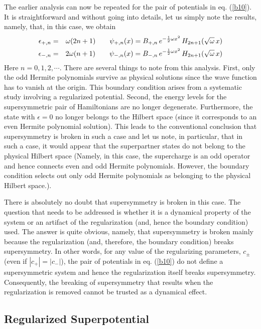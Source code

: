 \documentclass[a4paper,11pt]{article}
\begin{document}
The earlier analysis can now be repeated for the pair of potentials in
eq. (\ref{b10}). It
is straightforward and without going into details, let us simply note
the results, namely, that, in this case, we obtain
\begin{eqnarray}
\epsilon_{+,n} & = & \omega(2n+1)\qquad
\psi_{+,n}(x)=B_{+,n}\,e^{-{1\over 2}\omega
x^{2}}\,H_{2n+1}(\sqrt{\omega}\,x)\nonumber\\
\epsilon_{-,n} & = & 2\omega(n+1)\qquad
\psi_{-,n}(x)=B_{-,n}\,e^{-{1\over 2}\omega
x^{2}}\,H_{2n+1}(\sqrt{\omega}\,x)\label{b11}
\end{eqnarray}
Here $n=0,1,2,\cdots$. There are several things to note from this
analysis. First, only the odd Hermite polynomials survive as physical
solutions since the wave function has to vanish at the origin. This
boundary condition
arises from a systematic study involving a regularized
potential. Second, the energy levels for the supersymmetric pair of
Hamiltonians are no longer degenerate. Furthermore, the state with
$\epsilon = 0$ no longer belongs to the Hilbert space (since it
corresponds to an even Hermite polynomial solution). This leads to the
conventional conclusion that supersymmetry is broken in such a case
and let us note, in particular, that in such a case, it would appear
that the superpartner states do not belong to the physical Hilbert
space (Namely, in this case, the supercharge is an odd operator and
hence connects even and odd Hermite polynomials. However, the boundary
condition selects out only odd Hermite polynomials as belonging to the
physical Hilbert space.).

There is absolutely no doubt that supersymmetry is broken in this
case. The question that needs to be addressed is whether it is a
dynamical property of the system or an artifact of the regularization
(and, hence the boundary condition) used. The answer is quite obvious,
namely, that
supersymmetry is broken mainly because the regularization (and,
therefore, the boundary condition) breaks
supersymmetry. In other words, for any value of the regularizing
parameters, $c_{\pm}$ (even if $|c_{+}|=|c_{-}|$), the pair of
potentials in eq. (\ref{b10}) do not define a supersymmetric system
and hence the regularization itself breaks
supersymmetry. Consequently, the breaking of supersymmetry that
results when the regularization is removed cannot be trusted as a
dynamical effect.

\subsection*{Regularized Superpotential}
\end{document}
